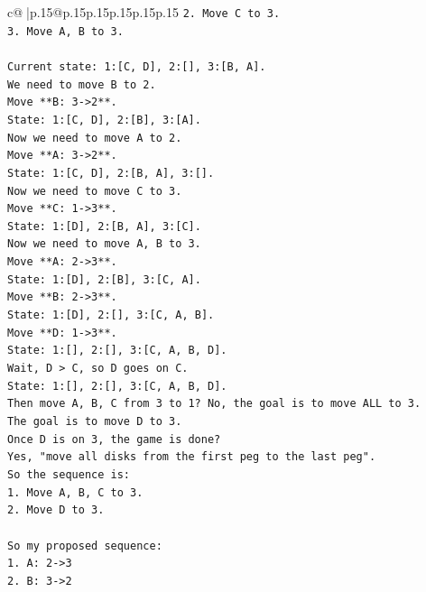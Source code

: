 \documentclass{article}
\begin{document}
{\begin{supertabular}{c@{$\;$}|p{.15\linewidth}@{}p{.15\linewidth}p{.15\linewidth}p{.15\linewidth}p{.15\linewidth}p{.15\linewidth}}
{{{\texttt{2. Move C to 3.} \\
\texttt{3. Move A, B to 3.} \\
\\ 
\texttt{Current state: 1:{[}C, D{]}, 2:{[}{]}, 3:{[}B, A{]}.} \\
\texttt{We need to move B to 2.} \\
\texttt{Move **B: 3{-}>2**.} \\
\texttt{State: 1:{[}C, D{]}, 2:{[}B{]}, 3:{[}A{]}.} \\
\texttt{Now we need to move A to 2.} \\
\texttt{Move **A: 3{-}>2**.} \\
\texttt{State: 1:{[}C, D{]}, 2:{[}B, A{]}, 3:{[}{]}.} \\
\texttt{Now we need to move C to 3.} \\
\texttt{Move **C: 1{-}>3**.} \\
\texttt{State: 1:{[}D{]}, 2:{[}B, A{]}, 3:{[}C{]}.} \\
\texttt{Now we need to move A, B to 3.} \\
\texttt{Move **A: 2{-}>3**.} \\
\texttt{State: 1:{[}D{]}, 2:{[}B{]}, 3:{[}C, A{]}.} \\
\texttt{Move **B: 2{-}>3**.} \\
\texttt{State: 1:{[}D{]}, 2:{[}{]}, 3:{[}C, A, B{]}.} \\
\texttt{Move **D: 1{-}>3**.} \\
\texttt{State: 1:{[}{]}, 2:{[}{]}, 3:{[}C, A, B, D{]}.} \\
\texttt{Wait, D > C, so D goes on C.} \\
\texttt{State: 1:{[}{]}, 2:{[}{]}, 3:{[}C, A, B, D{]}.} \\
\texttt{Then move A, B, C from 3 to 1? No, the goal is to move ALL to 3.} \\
\texttt{The goal is to move D to 3.} \\
\texttt{Once D is on 3, the game is done?} \\
\texttt{Yes, "move all disks from the first peg to the last peg".} \\
\texttt{So the sequence is:} \\
\texttt{1. Move A, B, C to 3.} \\
\texttt{2. Move D to 3.} \\
\\ 
\texttt{So my proposed sequence:} \\
\texttt{1. A: 2{-}>3} \\
\texttt{2. B: 3{-}>2} \\
}}}
\end{supertabular}}
\end{document}

